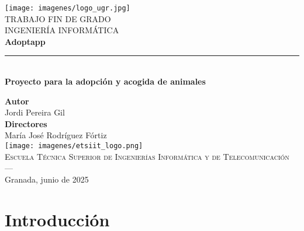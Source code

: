 \documentclass{article}
\renewcommand\maketitle{} %
\begin{document}
	\begin{titlepage}
		
		
		\newlength{\centeroffset}
		\setlength{\centeroffset}{-0.5\oddsidemargin}
		\addtolength{\centeroffset}{0.5\evensidemargin}
		\thispagestyle{empty}
		
		\noindent\hspace*{\centeroffset}\begin{minipage}{\textwidth}
			
			\centering
			\texttt{[image: imagenes/logo\_ugr.jpg]}\\[1.4cm]
			
			\textsc{ \Large TRABAJO FIN DE GRADO\\[0.2cm]}
			\textsc{ INGENIERÍA INFORMÁTICA}\\[1cm]
			{\Huge\bfseries Adoptapp\\
			}
			\noindent\rule[-1ex]{\textwidth}{3pt}\\[3.5ex]
			{\large\bfseries Proyecto para la adopción y acogida de animales}
		\end{minipage}
		
		\vspace{2.5cm}
		\noindent\hspace*{\centeroffset}\begin{minipage}{\textwidth}
			\centering
			
			\textbf{Autor}\\ {Jordi Pereira Gil}\\[2.5ex]
			\textbf{Directores}\\
			{María José Rodríguez Fórtiz}\\[2cm]
			\texttt{[image: imagenes/etsiit\_logo.png]}\\[0.1cm]
			\textsc{Escuela Técnica Superior de Ingenierías Informática y de Telecomunicación}\\
			\textsc{---}\\
			Granada, junio de 2025
		\end{minipage}
	\end{titlepage}
	
	
	

\maketitle

\section{Introducción}
\end{document}
